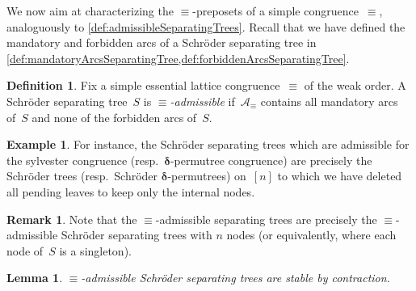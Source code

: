 \documentclass{amsart}
\newtheorem{lemma}[theorem]{Lemma}
\theoremstyle{definition}
\newtheorem{definition}[theorem]{Definition}
\newtheorem{example}[theorem]{Example}
\newtheorem{remark}[theorem]{Remark}
\renewcommand{\b}[1]{{\boldsymbol{#1}}} %
\newcommand{\darkblue}{\color{darkblue}} %
\newcommand{\defn}[1]{\textsl{\darkblue #1}} %
\newcommand{\arcs}{{\mathcal{A}}} %
\newcommand{\decoration}{{\b{\delta}}} %
\begin{document}
We now aim at characterizing the $\equiv$-preposets of a simple congruence~$\equiv$, analoguously to \cref{def:admissibleSeparatingTrees}.
Recall that we have defined the mandatory and forbidden arcs of a Schröder separating tree in \cref{def:mandatoryArcsSeparatingTree,def:forbiddenArcsSeparatingTree}.

\begin{definition}
\label{def:admissibleSchroderSeparatingTrees}
Fix a simple essential lattice congruence~$\equiv$ of the weak order.
A Schröder separating tree~$S$ is \defn{$\equiv$-admissible} if~$\arcs_\equiv$ contains all mandatory arcs of~$S$ and none of the forbidden arcs of~$S$.
\end{definition}

\begin{example}
For instance, the Schröder separating trees which are admissible for the sylvester congruence (resp.~$\decoration$-permutree congruence) are precisely the Schröder trees (resp.~Schröder  $\decoration$-permutrees) on~$[n]$ to which we have deleted all pending leaves to keep only the internal nodes.
\end{example}

\begin{remark}
Note that the $\equiv$-admissible separating trees are precisely the $\equiv$-admissible Schröder separating trees with $n$ nodes (or equivalently, where each node of~$S$ is a singleton).
\end{remark}

\begin{lemma}
\label{lem:contractionAdmissibleSchroderSeparatingTree}
$\equiv$-admissible Schröder separating trees are stable by contraction.
\end{lemma}
\end{document}
